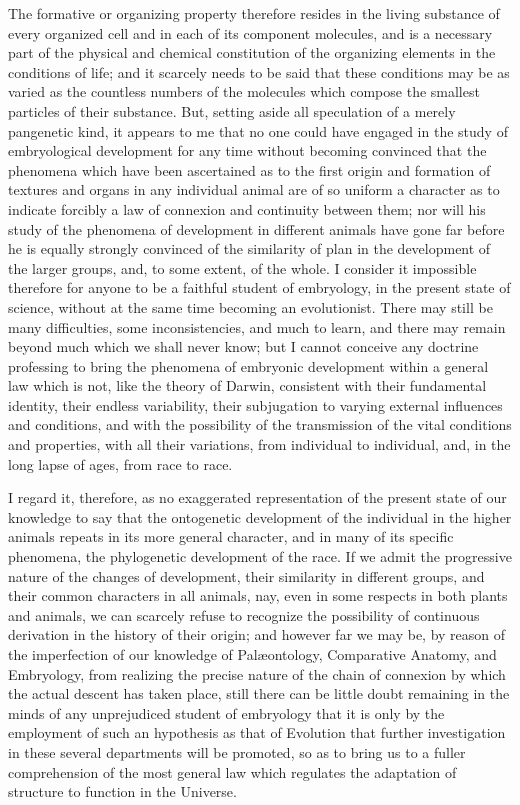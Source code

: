 \documentclass[a4paper, 11pt, oneside, english]{article}
\begin{document}
The formative or organizing property therefore resides in the living substance of every organized cell and in each of its component molecules, and is a necessary part of the physical and chemical constitution of the organizing elements in the conditions of life; and it scarcely needs to be said that these conditions may be as varied as the countless numbers of the molecules which compose the smallest particles of their substance. But, setting aside all speculation of a merely pangenetic kind, it appears to me that no one could have engaged in the study of embryological development for any time without becoming convinced that the phenomena which have been ascertained as to the first origin and formation of textures and organs in any individual animal are of so uniform a character as to indicate forcibly a law of connexion and continuity between them; nor will his study of the phenomena of development in different animals have gone far before he is equally strongly convinced of the similarity of plan in the development of the larger groups, and, to some extent, of the whole. I consider it impossible therefore for anyone to be a faithful student of embryology, in the present state of science, without at the same time becoming an evolutionist. There may still be many difficulties, some inconsistencies, and much to learn, and there may remain beyond much which we shall never know; but I cannot conceive any doctrine professing to bring the phenomena of embryonic development within a general law which is not, like the theory of Darwin, consistent with their fundamental identity, their endless variability, their subjugation to varying external influences and conditions, and with the possibility of the transmission of the vital conditions and properties, with all their variations, from individual to individual, and, in the long lapse of ages, from race to race.

I regard it, therefore, as no exaggerated representation of the present state of our knowledge to say that the ontogenetic development of the individual in the higher animals repeats in its more general character, and in many of its specific phenomena, the phylogenetic development of the race. If we admit the progressive nature of the changes of development, their similarity in different groups, and their common characters in all animals, nay, even in some respects in both plants and animals, we can scarcely refuse to recognize the possibility of continuous derivation in the history of their origin; and however far we may be, by reason of the imperfection of our knowledge of Palæontology, Comparative Anatomy, and Embryology, from realizing the precise nature of the chain of connexion by which the actual descent has taken place, still there can be little doubt remaining in the minds of any unprejudiced student of embryology that it is only by the employment of such an hypothesis as that of Evolution that further investigation in these several departments will be promoted, so as to bring us to a fuller comprehension of the most general law which regulates the adaptation of structure to function in the Universe.
\clearpage
\end{document}
